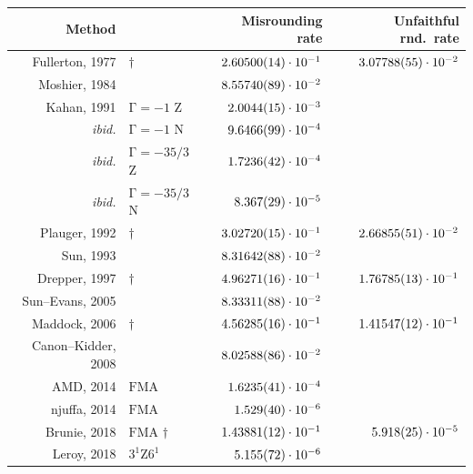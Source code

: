 ﻿\documentclass[10pt, a4paper, twoside]{basestyle}
\begin{document}
\begin{table}[b!]
\setmainfont[Mapping=tex-text,
             Numbers={OldStyle, Monospaced},
             Ligatures={TeX, Common, Discretionary},
             SmallCapsFeatures={Letters=SmallCaps},
             Contextuals=WordFinal,]{Linux Libertine O}
\begin{center}
\begin{tabular}{rlrr}
Method && Misrounding rate & \cbstart{}Unfaithful rnd.~rate\cbend{} \\
\hline
Fullerton, 1977& $\dagger$  & $2.60500(14)\cdot10^{-1}$ & \cbstart{}$3.07788(55)\cdot10^{-2}$\cbend{} \\
Moshier, 1984&              & $8.55740(89)\cdot10^{-2}$ \\
Kahan, 1991 & $\mathrm{Γ}=-1$ \cbstart{}$\mathrm{Z}$\cbend{}     & $2.0044(15)\cdot10^{-3}$  \\
\emph{ibid.}& $\mathrm{Γ}=-1$ $\mathrm{N}$     & $9.6466(99)\cdot10^{-4}$  \\
\emph{ibid.}& $\mathrm{Γ}=-35/3$ \cbstart{}$\mathrm{Z}$\cbend{}  & $1.7236(42)\cdot10^{-4}$  \\
\emph{ibid.}& $\mathrm{Γ}=-35/3$ $\mathrm{N}$  & $8.367(29)\cdot10^{-5}$   \\
Plauger, 1992& $\dagger$    & $3.02720(15)\cdot10^{-1}$ & \cbstart{}$2.66855(51)\cdot10^{-2}$\cbend{}\\
Sun,     1993&              & $8.31642(88)\cdot10^{-2}$ \\
Drepper, 1997& $\dagger$    & $4.96271(16)\cdot10^{-1}$ & \cbstart{}$1.76785(13)\cdot10^{-1}$\cbend{} \\
Sun--Evans, 2005&           & $8.33311(88)\cdot10^{-2}$ \\
Maddock, 2006& $\dagger$    & $4.56285(16)\cdot10^{-1}$ & \cbstart{}$1.41547(12)\cdot10^{-1}$\cbend{}\\
Canon--Kidder, 2008&        & $8.02588(86)\cdot10^{-2}$ \\
AMD, 2014& \cbstart{}$\mathrm{FMA}$\cbend{}              & $1.6235(41)\cdot10^{-4}$ \\
njuffa, 2014& \cbstart{}$\mathrm{FMA}$\cbend{}           & $1.529(40)\cdot10^{-6}$ \\
\cbstart{}Brunie, 2018& $\mathrm{FMA}$ $\dagger$            & $1.43881(12)\cdot10^{-1}$ & $5.918(25)\cdot10^{-5}$\cbend{}\\
Leroy, 2018 & \cbstart{}$3^1\mathrm{Z}6^1$\cbend{}              & $5.155(72)\cdot10^{-6}$ \\

\end{tabular}
\end{center}
\end{table}
\end{document}
